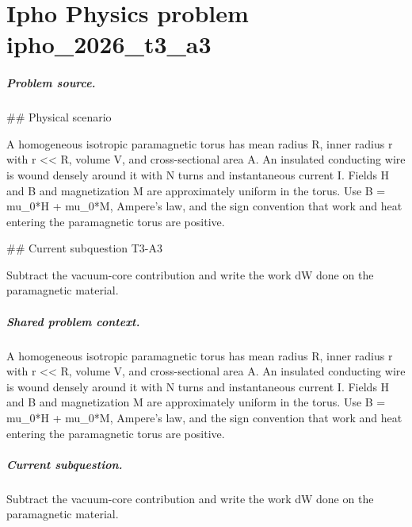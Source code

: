 
\chapter{Ipho Physics problem ipho\_2026\_t3\_a3}
\label{ch:IPhO2026Problems_problem_ipho_2026_t3_a3}

\paragraph{Problem source.}
\#\# Physical scenario

A homogeneous isotropic paramagnetic torus has mean radius R, inner radius r
with r << R, volume V, and cross-sectional area A.  An insulated conducting
wire is wound densely around it with N turns and instantaneous current I.
Fields H and B and magnetization M are approximately uniform in the torus.
Use B = mu\_0*H + mu\_0*M, Ampere's law, and the sign convention that work and
heat entering the paramagnetic torus are positive.

\#\# Current subquestion T3-A3

Subtract the vacuum-core contribution and write the work dW done on the paramagnetic material.

\paragraph{Shared problem context.}
A homogeneous isotropic paramagnetic torus has mean radius R, inner radius r
with r << R, volume V, and cross-sectional area A.  An insulated conducting
wire is wound densely around it with N turns and instantaneous current I.
Fields H and B and magnetization M are approximately uniform in the torus.
Use B = mu\_0*H + mu\_0*M, Ampere's law, and the sign convention that work and
heat entering the paramagnetic torus are positive.

\paragraph{Current subquestion.}
Subtract the vacuum-core contribution and write the work dW done on the paramagnetic material.

